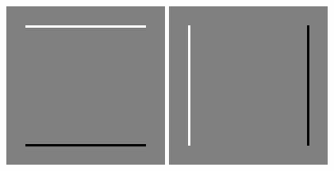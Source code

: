 \begin{example}
\begin{description}
\begin{figure}[ht]
\begin{minipage}{0.3\textwidth}
    \end{minipage}
    \hfill
    \begin{minipage}{0.3\textwidth}
    \includegraphics[width=\textwidth]{Bilder/Gradient_x}
    \end{minipage}
    \hfill
    \begin{minipage}{0.3\textwidth}
    \includegraphics[width=\textwidth]{Bilder/Gradient_y}

\end{minipage}
\end{figure}
\end{description}
\end{example}
